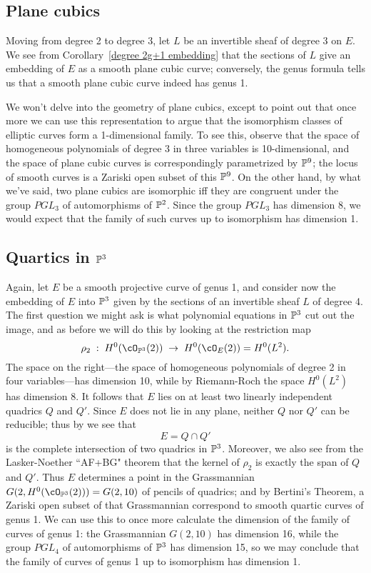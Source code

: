 \subsection{Plane cubics}

Moving from degree 2 to degree 3, let $L$ be an invertible sheaf of degree 3 on $E$. We see from Corollary~\ref{degree 2g+1 embedding} that the sections of $L$ give an embedding of $E$ as a smooth plane cubic curve; conversely, the genus formula tells us that a smooth plane cubic curve indeed has genus 1. 

We won't delve into the geometry of plane cubics, except to point out that once more we can use this representation to argue that the isomorphism classes of elliptic curves form a 1-dimensional family. To see this, observe that the space of homogeneous polynomials of degree 3 in three variables is 10-dimensional, and the space of plane cubic curves is correspondingly parametrized by  $\PP^9$; the locus of smooth curves is a Zariski open subset of this $\PP^9$. On the other hand, by what we've said, two plane cubics are isomorphic iff they are congruent under the group $PGL_3$ of automorphisms of $\PP^2$. Since the group $PGL_3$ has dimension 8, we would expect that the family of such curves up to isomorphism has dimension 1.

\subsection{Quartics in $\PP^3$} 

Again, let $E$ be a smooth projective curve of genus 1, and consider now the embedding of $E$ into $\PP^3$ given by the sections of an invertible sheaf $L$ of degree 4. The first question we might ask is what polynomial equations in $\PP^3$ cut out the image, and as before we will do this by looking at the restriction map
$$
\rho_2 \;  : \; H^0(\cO_{\PP^3}(2)) \; \to \; H^0(\cO_{E}(2)) = H^0(L^2).
$$
The space on the right---the space of homogeneous polynomials of degree 2 in four variables---has dimension 10, while by Riemann-Roch the space $H^0(L^2)$ has dimension 8. It follows that $E$ lies on at least two linearly independent quadrics $Q$ and $Q'$. Since $E$ does not lie in any plane, neither $Q$ nor $Q'$ can be reducible; thus by \bt we see that
$$
E = Q \cap Q'
$$
is the complete intersection of two quadrics in $\PP^3$. Moreover, we also see from the Lasker-Noether ``AF+BG" theorem that the kernel of $\rho_2$ is exactly the span of $Q$ and $Q'$. Thus $E$ determines a point in the Grassmannian $G(2, H^0(\cO_{\PP^3}(2))) = G(2, 10)$ of pencils of quadrics; and by Bertini's Theorem, a Zariski open subset of that Grassmannian correspond to smooth quartic curves of genus 1. We can use this to once more calculate the dimension of the family of curves of genus 1: the Grassmannian $G(2,10)$ has dimension 16, while the group $PGL_4$ of automorphisms of $\PP^3$ has dimension 15, so we may conclude that the family of curves of genus 1 up to isomorphism has dimension 1.


